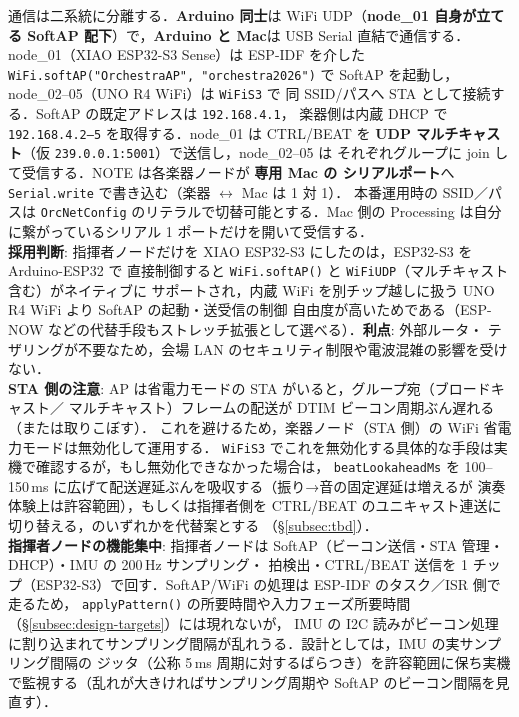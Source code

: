 \documentclass[lualatex,book,paper=a4paper,jafontsize=11.5pt,jafontscale=1.05]{jlreq}
\begin{document}
通信は二系統に分離する．\textbf{Arduino 同士}は WiFi UDP（\textbf{node\_01 自身が立てる
SoftAP 配下}）で，\textbf{Arduino と Mac}は USB Serial 直結で通信する．
node\_01（XIAO ESP32-S3 Sense）は ESP-IDF を介した \texttt{WiFi.softAP("OrchestraAP",
"orchestra2026")} で SoftAP を起動し，node\_02--05（UNO R4 WiFi）は \texttt{WiFiS3} で
同 SSID/パスへ STA として接続する．SoftAP の既定アドレスは \texttt{192.168.4.1}，
楽器側は内蔵 DHCP で \texttt{192.168.4.2--5} を取得する．node\_01 は CTRL/BEAT を
\textbf{UDP マルチキャスト}（仮 \texttt{239.0.0.1:5001}）で送信し，node\_02--05 は
それぞれグループに join して受信する．NOTE は各楽器ノードが \textbf{専用 Mac の
シリアルポート}へ \texttt{Serial.write} で書き込む（楽器 $\leftrightarrow$ Mac は 1 対 1）．
本番運用時の SSID／パスは \texttt{OrcNetConfig} のリテラルで切替可能とする．Mac 側の
Processing は自分に繋がっているシリアル 1 ポートだけを開いて受信する．\\[2pt]
\textbf{採用判断}: 指揮者ノードだけを XIAO ESP32-S3 にしたのは，ESP32-S3 を Arduino-ESP32 で
直接制御すると \texttt{WiFi.softAP()} と \texttt{WiFiUDP}（マルチキャスト含む）がネイティブに
サポートされ，内蔵 WiFi を別チップ越しに扱う UNO R4 WiFi より SoftAP の起動・送受信の制御
自由度が高いためである（ESP-NOW などの代替手段もストレッチ拡張として選べる）．\textbf{利点}: 外部ルータ・
テザリングが不要なため，会場 LAN のセキュリティ制限や電波混雑の影響を受けない．\\[2pt]
\textbf{STA 側の注意}: AP は省電力モードの STA がいると，グループ宛（ブロードキャスト／
マルチキャスト）フレームの配送が DTIM ビーコン周期ぶん遅れる（または取りこぼす）．
これを避けるため，楽器ノード（STA 側）の WiFi 省電力モードは無効化して運用する．
\texttt{WiFiS3} でこれを無効化する具体的な手段は実機で確認するが，もし無効化できなかった場合は，
\texttt{beatLookaheadMs} を 100--150\,ms に広げて配送遅延ぶんを吸収する（振り→音の固定遅延は増えるが
演奏体験上は許容範囲），もしくは指揮者側を CTRL/BEAT のユニキャスト連送に切り替える，のいずれかを代替案とする
（\S\ref{subsec:tbd}）．\\[2pt]
\textbf{指揮者ノードの機能集中}: 指揮者ノードは SoftAP（ビーコン送信・STA 管理・DHCP）・IMU の 200\,Hz サンプリング・
拍検出・CTRL/BEAT 送信を 1 チップ（ESP32-S3）で回す．SoftAP/WiFi の処理は ESP-IDF のタスク／ISR 側で走るため，
\texttt{applyPattern()} の所要時間や入力フェーズ所要時間（\S\ref{subsec:design-targets}）には現れないが，
IMU の I2C 読みがビーコン処理に割り込まれてサンプリング間隔が乱れうる．設計としては，IMU の実サンプリング間隔の
ジッタ（公称 5\,ms 周期に対するばらつき）を許容範囲に保ち実機で監視する（乱れが大きければサンプリング周期や
SoftAP のビーコン間隔を見直す）．
\end{document}
